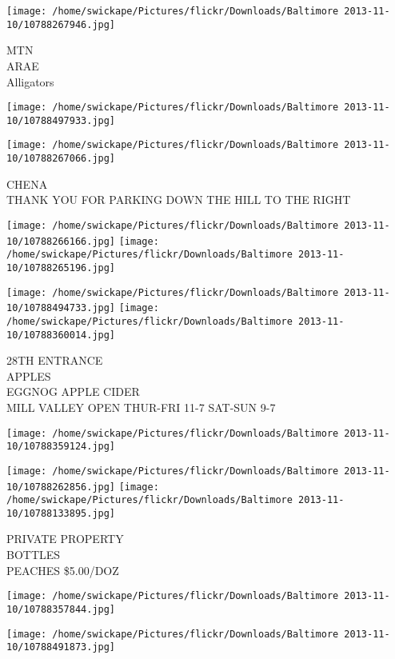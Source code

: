 \documentclass[10pt,letterpaper]{article}
\begin{document}
\vspace{0.25in}
\texttt{[image: /home/swickape/Pictures/flickr/Downloads/Baltimore 2013-11-10/10788267946.jpg]}

MTN\\
ARAE\\
Alligators
\pagebreak

\texttt{[image: /home/swickape/Pictures/flickr/Downloads/Baltimore 2013-11-10/10788497933.jpg]}

\vspace{0.25in}
\texttt{[image: /home/swickape/Pictures/flickr/Downloads/Baltimore 2013-11-10/10788267066.jpg]}

CHENA\\
THANK YOU FOR PARKING DOWN THE HILL TO THE RIGHT
\pagebreak

\texttt{[image: /home/swickape/Pictures/flickr/Downloads/Baltimore 2013-11-10/10788266166.jpg]}
\texttt{[image: /home/swickape/Pictures/flickr/Downloads/Baltimore 2013-11-10/10788265196.jpg]}

\texttt{[image: /home/swickape/Pictures/flickr/Downloads/Baltimore 2013-11-10/10788494733.jpg]}
\texttt{[image: /home/swickape/Pictures/flickr/Downloads/Baltimore 2013-11-10/10788360014.jpg]}

28TH ENTRANCE\\
APPLES\\
EGGNOG APPLE CIDER\\
MILL VALLEY OPEN THUR{-}FRI 11{-}7 SAT{-}SUN 9{-}7
\pagebreak

\texttt{[image: /home/swickape/Pictures/flickr/Downloads/Baltimore 2013-11-10/10788359124.jpg]}

\vspace{0.25in}
\texttt{[image: /home/swickape/Pictures/flickr/Downloads/Baltimore 2013-11-10/10788262856.jpg]}
\texttt{[image: /home/swickape/Pictures/flickr/Downloads/Baltimore 2013-11-10/10788133895.jpg]}

PRIVATE PROPERTY\\
BOTTLES\\
PEACHES \$5.00/DOZ
\pagebreak

\texttt{[image: /home/swickape/Pictures/flickr/Downloads/Baltimore 2013-11-10/10788357844.jpg]}

\vspace{0.25in}
\texttt{[image: /home/swickape/Pictures/flickr/Downloads/Baltimore 2013-11-10/10788491873.jpg]}
\end{document}
